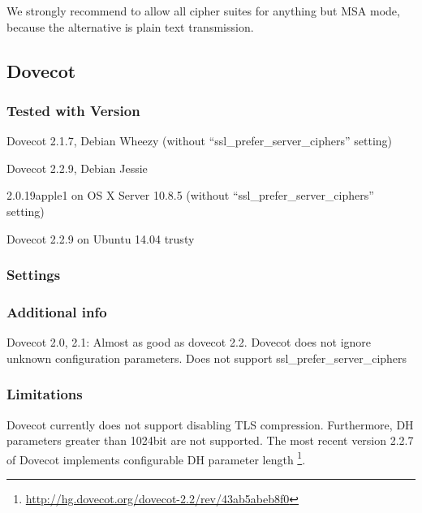 
We strongly recommend to allow all cipher suites for anything but MSA
mode, because the alternative is plain text transmission.

\subsection{Dovecot}


\subsubsection{Tested with Version}
\begin{itemize*}
  \item Dovecot 2.1.7, Debian Wheezy (without ``ssl\_prefer\_server\_ciphers'' setting)
  \item Dovecot 2.2.9, Debian Jessie
  \item 2.0.19apple1 on OS X Server 10.8.5 (without ``ssl\_prefer\_server\_ciphers'' setting)
  \item Dovecot 2.2.9 on Ubuntu 14.04 trusty
\end{itemize*}

\subsubsection{Settings}


\subsubsection{Additional info}
Dovecot 2.0, 2.1: Almost as good as dovecot 2.2. Dovecot does not ignore unknown configuration parameters. Does not support
ssl\_prefer\_server\_ciphers

\subsubsection{Limitations}
Dovecot currently does not support disabling TLS compression. Furthermore, DH
parameters greater than 1024bit are not supported. The most recent version
2.2.7 of Dovecot implements configurable DH parameter length
\footnote{\url{http://hg.dovecot.org/dovecot-2.2/rev/43ab5abeb8f0}}.

